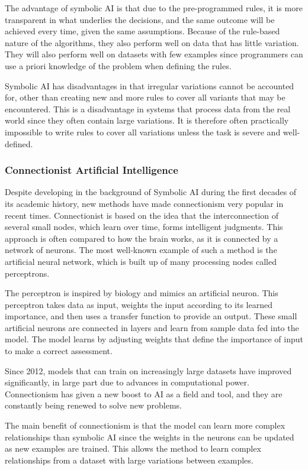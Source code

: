 The advantage of symbolic AI is that due to the pre-programmed rules, it is more transparent in what underlies the decisions, and the same outcome will be achieved every time, given the same assumptions. Because of the rule-based nature of the algorithms, they also perform well on data that has little variation. They will also perform well on datasets with few examples since programmers can use a priori knowledge of the problem when defining the rules.

Symbolic AI has disadvantages in that irregular variations cannot be accounted for, other than creating new and more rules to cover all variants that may be encountered. This is a disadvantage in systems that process data from the real world since they often contain large variations. It is therefore often practically impossible to write rules to cover all variations unless the task is severe and well-defined.


\subsubsection{Connectionist Artificial Intelligence}
Despite developing in the background of Symbolic AI during the first decades of its academic history, new methods have made connectionism very popular in recent times.  Connectionist is based on the idea that the interconnection of several small nodes, which learn over time, forms intelligent judgments. This approach is often compared to how the brain works, as it is connected by a network of neurons. The most well-known example of such a method is the artificial neural network, which is built up of many processing nodes called perceptrons.

The perceptron is inspired by biology and mimics an artificial neuron. This perceptron takes data as input, weights the input according to its learned importance, and then uses a transfer function to provide an output. These small artificial neurons are connected in layers and learn from sample data fed into the model. The model learns by adjusting weights that define the importance of input to make a correct assessment.

Since 2012, models that can train on increasingly large datasets have improved significantly, in large part due to advances in computational power. Connectionism has given a new boost to AI as a field and tool, and they are constantly being renewed to solve new problems.

The main benefit of connectionism is that the model can learn more complex relationships than symbolic AI since the weights in the neurons can be updated as new examples are trained. This allows the method to learn complex relationships from a dataset with large variations between examples.

